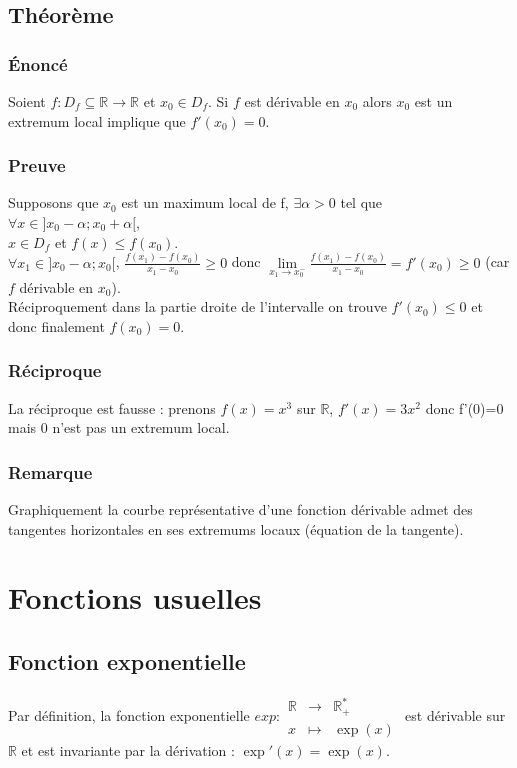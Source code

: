\documentclass[a4paper,10pt]{book} %
\newcommand{\R}{\mathbb{R}}
\newcommand{\Rpe}{\mathbb{R}_{+}^{*}}
\begin{document}
\subsection{Théorème}
\subsubsection{Énoncé}
Soient $f : D_f \subseteq \R \rightarrow \R$ et $x_0 \in D_f$. Si $f$ est dérivable en $x_0$ alors $x_0$ est un extremum local implique que $f'(x_0)=0$.

\subsubsection{Preuve}
Supposons que $x_0$ est un maximum local de f, $\exists \alpha>0$ tel que $\forall x\in ]x_{0}-\alpha;x_{0}+\alpha[$,\\
$x\in D_f$ et $f(x)\leq f(x_0)$.\\

$\forall x_1\in ]x_{0}-\alpha;x_{0}[$, $\frac{f(x_1)-f(x_0)}{x_1-x_0}\geq 0$ donc $\lim\limits_{x_1\rightarrow x_0^-}\frac{f(x_1)-f(x_0)}{x_1-x_0}=f'(x_0)\geq 0$ (car $f$ dérivable en $x_0$).\\

Réciproquement dans la partie droite de l'intervalle on trouve $f'(x_0)\leq 0$ et\\
donc finalement $f(x_0)=0$.

\subsubsection{Réciproque}
La réciproque est fausse : prenons $f(x)=x^3$ sur $\R$, $f'(x)=3x^2$ donc f'(0)=0 mais 0 n'est pas un extremum local.

\subsubsection{Remarque}
Graphiquement la courbe représentative d'une fonction dérivable admet des tangentes horizontales en ses extremums locaux (équation de la tangente).

\newpage

\section{Fonctions usuelles}
\subsection{Fonction exponentielle}
Par définition, la fonction exponentielle $exp: \begin{array}{rcl}
\R & \rightarrow & \Rpe \\
x&\mapsto & \exp(x) \end{array}$ est dérivable sur $\R$ et est invariante par la dérivation : $\exp'(x)=\exp(x)$.
\end{document}
